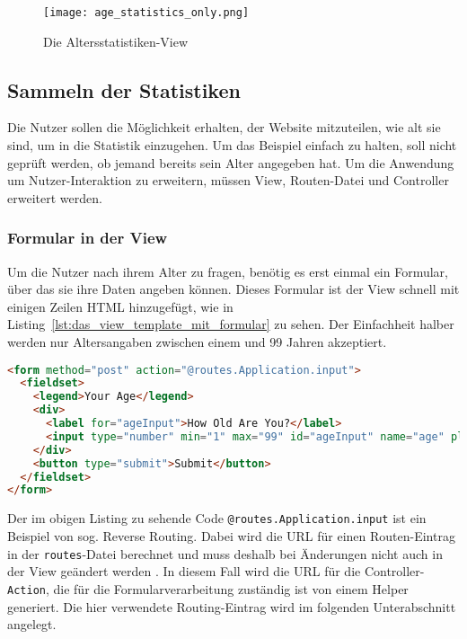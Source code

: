 \begin{figure}
\centering
\texttt{[image: age\_statistics\_only.png]}
\caption{Die Altersstatistiken-View}
\label{fig:die_altersstatistiken_view}
\end{figure}




\subsection{Sammeln der Statistiken} %
\label{sub:sammeln_der_statistiken}

Die Nutzer sollen die Möglichkeit erhalten, der Website mitzuteilen, wie alt sie sind, um in die Statistik einzugehen.
Um das Beispiel einfach zu halten, soll nicht geprüft werden, ob jemand bereits sein Alter angegeben hat.
Um die Anwendung um Nutzer-Interaktion zu erweitern, müssen View, Routen-Datei und Controller erweitert werden.

\subsubsection{Formular in der View} %
\label{ssub:formular_in_der_view}

Um die Nutzer nach ihrem Alter zu fragen, benötig es erst einmal ein Formular, über das sie ihre Daten angeben können.
Dieses Formular ist der View schnell mit einigen Zeilen HTML hinzugefügt, wie in Listing~\ref{lst:das_view_template_mit_formular} zu sehen.
Der Einfachheit halber werden nur Altersangaben zwischen einem und 99 Jahren akzeptiert.

\begin{lstlisting}[language=html, caption=Das View-Template mit Formular, label=lst:das_view_template_mit_formular]
<form method="post" action="@routes.Application.input">
  <fieldset>
    <legend>Your Age</legend>
    <div>
      <label for="ageInput">How Old Are You?</label>
      <input type="number" min="1" max="99" id="ageInput" name="age" placeholder="Enter Age">
    </div>
    <button type="submit">Submit</button>
  </fieldset>
</form>
\end{lstlisting}

Der im obigen Listing zu sehende Code \lstinline|@routes.Application.input| ist ein Beispiel von sog. Reverse Routing.
Dabei wird die URL für einen Routen-Eintrag in der \lstinline|routes|-Datei berechnet und muss deshalb bei Änderungen nicht auch in der View geändert werden \cite[vgl.][S.~98--100]{play_for_scala}.
In diesem Fall wird die URL für die Controller-\lstinline|Action|, die für die Formularverarbeitung zuständig ist von einem Helper generiert.
Die hier verwendete Routing-Eintrag wird im folgenden Unterabschnitt angelegt.


